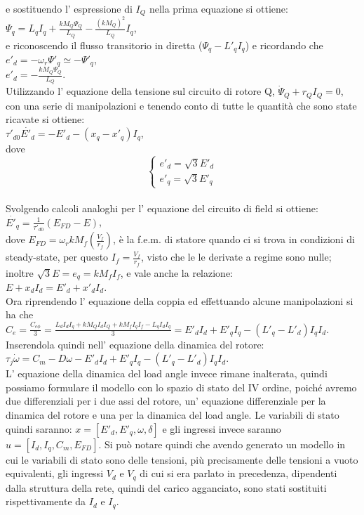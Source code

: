 \documentclass[Lau,noexaminfo]{sapthesis}
\begin{document}
	e sostituendo l' espressione di $I_Q$ nella prima equazione si ottiene:\\
	$\Psi_q=L_qI_q+\frac{kM_Q\Psi_Q}{L_Q}-\frac{(kM_Q)^2}{L_Q}I_q$,\\
	e riconoscendo il flusso transitorio in diretta ($\Psi_q-L'_qI_q$) e ricordando che $e'_d=-\omega_r\Psi'_q\simeq -\Psi'_q$,\\
	$e'_d=-\frac{kM_Q\Psi_Q}{L_Q}$.\\
	Utilizzando l' equazione della tensione sul circuito di rotore Q, $\dot{\Psi}_Q+r_QI_Q=0$, con una serie di manipolazioni e tenendo conto di tutte le quantità che sono state ricavate si ottiene:\\
	$\tau'_{d0} \dot{E'_d}=-E'_d-(x_q-x'_q)I_q$, \\dove
	\[
	\begin{cases}
	e'_d=\sqrt{3}E'_d\\
	e'_q=\sqrt{3}E'_q
	\end{cases}
	\]\\
	Svolgendo calcoli analoghi per l' equazione del circuito di field si ottiene:\\
	$\dot{E'_q}=\frac{1}{\tau'_{d0}}(E_{FD}-E)$,\\
	dove $E_{FD}=\omega_rkM_f(\frac{V_f}{r_f})$, è la f.e.m. di statore quando ci si trova in condizioni di steady-state, per questo $I_f=\frac{V_f}{r_f}$, visto che le le derivate a regime sono nulle; inoltre $\sqrt{3}E=e_q=kM_fI_f$, e vale anche la relazione:\\ $E+x_dI_d=E'_d+x'_dI_d$.\\
	Ora riprendendo l' equazione della coppia ed effettuando alcune manipolazioni si ha che\\
	$C_e=\frac{C_{e\phi}}{3}=\frac{L_dI_dI_q+kM_QI_dI_Q+kM_fI_qI_f-L_qI_dI_q}{3}=E'_dI_d+E'_qI_q-(L'_q-L'_d)I_qI_d$.\\
	Inserendola quindi nell' equazione della dinamica del rotore:\\
	$\tau_j\dot{\omega}=C_m-D\omega-E'_dI_d+E'_qI_q-(L'_q-L'_d)I_qI_d$.\\
	L' equazione della dinamica del load angle invece rimane inalterata, quindi possiamo formulare il modello con lo spazio di stato del IV ordine, poiché avremo due differenziali per i due assi del rotore, un' equazione differenziale per la dinamica del rotore e una per la dinamica del load angle. Le variabili di stato quindi saranno: $x=[E'_d,E'_q,\omega,\delta]$ e gli ingressi invece saranno $u=[I_d,I_q,C_m,E_{FD}]$. Si può notare quindi che avendo generato un modello in cui le variabili di stato sono delle tensioni, più precisamente delle tensioni a vuoto equivalenti, gli ingressi $V_d$ e $V_q$ di cui si era parlato in precedenza, dipendenti dalla struttura della rete, quindi del carico agganciato, sono stati sostituiti rispettivamente da $I_d$ e $I_q$.\\
\end{document}
